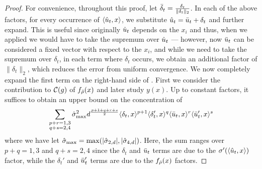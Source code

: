\begin{proof}
For convenience, throughout this proof, let $\bar{\delta}_t = \frac{\delta_t}{\|\delta_t\|_2}$. In each of the above factors, for every occurrence of $\langle \hat{u}_t, x \rangle$, we substitute $\hat{u}_t = \bar{u}_t + \delta_t$ and further expand. This is useful since originally $\hat{u}_t$ depends on the $x_i$ and thus, when we applied  we would have to take the supremum over $\hat{u}_t$ --- however, now $\bar{u}_t$ can be considered a fixed vector with respect to the $x_i$, and while we need to take the supremum over $\delta_t$, in each term where $\delta_t$ occurs, we obtain an additional factor of $\|\delta_t\|_2$, which reduces the error from uniform convergence. We now completely expand the first term on the right-hand side of . First we consider the contribution to $\mathcal{C}(g)$ of $f_{{\hat{\rho}}}(x)$ and later study $y(x)$. Up to constant factors, it suffices to obtain an upper bound on the concentration of
\begin{align} \label{eq:concentration_goal}
\sum_{\substack{p + r = 1, 3 \\ q + s = 2, 4}} \hat{\sigma}_{\textup{max}}^2 d^{\frac{p + 1 + q + r + s}{2}} \langle \delta_t, x \rangle^{p + 1} \langle \delta_t', x \rangle^q \langle \bar{u}_t, x \rangle^r \langle \bar{u}_t', x \rangle^s
\end{align}
where we have let $\hat{\sigma}_{\textup{max}} = \max(|\hat{\sigma}_{2, d}|, |\hat{\sigma}_{4, d}|)$. Here, the sum ranges over $p + q = 1, 3$ and $q + s = 2, 4$ since the $\delta_t$ and $\bar{u}_t$ terms are due to the $\sigma'(\langle \hat{u}_t, x \rangle)$ factor, while the $\delta_t'$ and $\bar{u}_t'$ terms are due to the $f_{{\hat{\rho}}}(x)$ factors.


\end{proof}
